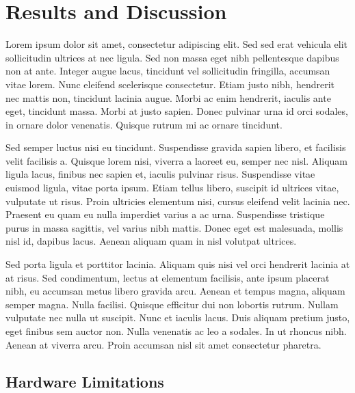 \chapter{Results and Discussion}
\label{ch:results}

Lorem ipsum dolor sit amet, consectetur adipiscing elit. Sed sed erat vehicula elit sollicitudin ultrices at nec ligula. Sed non massa eget nibh pellentesque dapibus non at ante. Integer augue lacus, tincidunt vel sollicitudin fringilla, accumsan vitae lorem. Nunc eleifend scelerisque consectetur. Etiam justo nibh, hendrerit nec mattis non, tincidunt lacinia augue. Morbi ac enim hendrerit, iaculis ante eget, tincidunt massa. Morbi at justo sapien. Donec pulvinar urna id orci sodales, in ornare dolor venenatis. Quisque rutrum mi ac ornare tincidunt.

Sed semper luctus nisi eu tincidunt. Suspendisse gravida sapien libero, et facilisis velit facilisis a. Quisque lorem nisi, viverra a laoreet eu, semper nec nisl. Aliquam ligula lacus, finibus nec sapien et, iaculis pulvinar risus. Suspendisse vitae euismod ligula, vitae porta ipsum. Etiam tellus libero, suscipit id ultrices vitae, vulputate ut risus. Proin ultricies elementum nisi, cursus eleifend velit lacinia nec. Praesent eu quam eu nulla imperdiet varius a ac urna. Suspendisse tristique purus in massa sagittis, vel varius nibh mattis. Donec eget est malesuada, mollis nisl id, dapibus lacus. Aenean aliquam quam in nisl volutpat ultrices.

Sed porta ligula et porttitor lacinia. Aliquam quis nisi vel orci hendrerit lacinia at at risus. Sed condimentum, lectus at elementum facilisis, ante ipsum placerat nibh, eu accumsan metus libero gravida arcu. Aenean et tempus magna, aliquam semper magna. Nulla facilisi. Quisque efficitur dui non lobortis rutrum. Nullam vulputate nec nulla ut suscipit. Nunc et iaculis lacus. Duis aliquam pretium justo, eget finibus sem auctor non. Nulla venenatis ac leo a sodales. In ut rhoncus nibh. Aenean at viverra arcu. Proin accumsan nisl sit amet consectetur pharetra.

\section{Hardware Limitations} %
\label{sec:shortcomings}